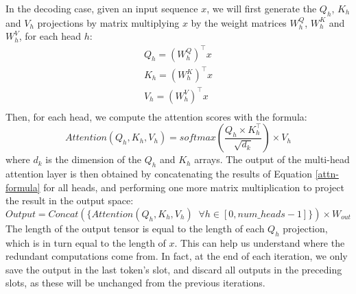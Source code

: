 In the decoding case, given an input sequence $x$, we will first generate the $Q_h$, $K_h$ and $V_h$ projections by matrix multiplying $x$ by the weight matrices $W_h^Q$, $W_h^K$ and $W_h^V$, for each head $h$:
\begin{align}\label{qkv-equations}
    Q_h = (W_h^Q)^\top x \\
    K_h = (W_h^K)^\top x \\
    V_h = (W_h^V)^\top x \\
\end{align}
Then, for each head, we compute the attention scores with the formula:
\begin{equation}\label{attn-formula}
    Attention(Q_h, K_h, V_h) = softmax\left(\frac{Q_h \times K_h^\top}{\sqrt{d_k}}\right) \times V_h
\end{equation}
where $d_k$ is the dimension of the $Q_h$ and $K_h$ arrays. The output of the multi-head attention layer is then obtained by concatenating the results of Equation \ref{attn-formula} for all heads, and performing one more matrix multiplication to project the result in the output space: 
\begin{equation}
    Output = Concat(\{Attention(Q_h, K_h, V_h) \;\; \forall h \in [0, num\_heads-1]\}) \times W_{out}
\end{equation}
The length of the output tensor is equal to the length of each $Q_h$ projection, which is in turn equal to the length of $x$. This can help us understand where the redundant computations come from. In fact, at the end of each iteration, we only save the output in the last token's slot, and discard all outputs in the preceding slots, as these will be unchanged from the previous iterations. 

